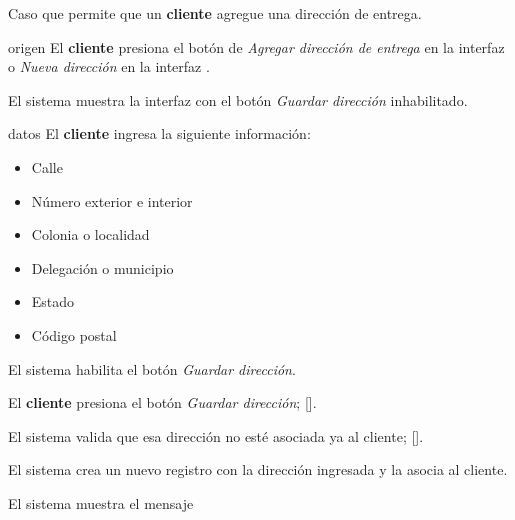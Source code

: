 %
%

{
  Caso que permite que un \textbf{cliente} agregue una dirección de entrega.

  \begin{trayectoriaPrincipal}

    \item[origen] El \textbf{cliente} presiona el botón de
      \textit{Agregar dirección de entrega} en la interfaz
       o
      \textit{Nueva dirección} en
      la interfaz .

    \item El sistema muestra la interfaz
       con el botón
      \textit{Guardar dirección} inhabilitado.

    \item[datos] El \textbf{cliente} ingresa la siguiente información:
      \begin{itemize}
        \item Calle
        \item Número exterior e interior
        \item Colonia o localidad
        \item Delegación o municipio
        \item Estado
        \item Código postal
      \end{itemize}

    \item El sistema habilita el botón \textit{Guardar dirección}.

    \item El \textbf{cliente} presiona el botón \textit{Guardar dirección};
      [].

    \item El sistema valida que esa dirección no esté asociada ya al cliente;
      [].

    \item El sistema crea un nuevo registro con la dirección ingresada y la
      asocia al cliente.

    \item El sistema muestra el mensaje


\end{trayectoriaPrincipal}}
